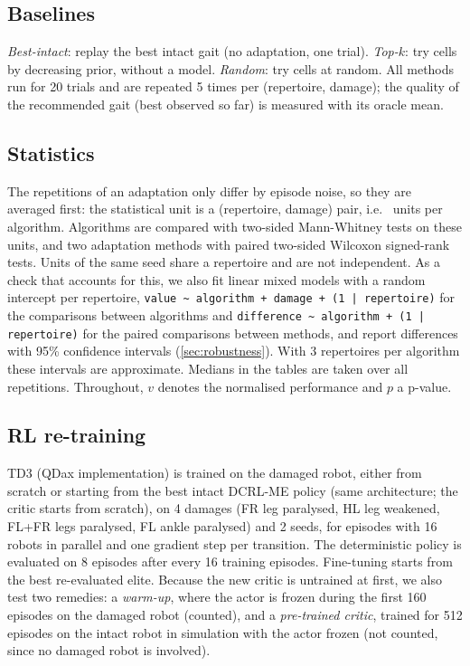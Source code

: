 \documentclass[11pt,a4paper]{article}
\newcommand{\DCRL}{DCRL-ME}
\begin{document}
\subsection{Baselines}
\emph{Best-intact}: replay the best intact gait (no adaptation, one trial). \emph{Top-$k$}: try cells by decreasing
prior, without a model. \emph{Random}: try cells at random. All methods run for 20 trials and are repeated 5 times
per (repertoire, damage); the quality of the recommended gait (best observed so far) is measured with its oracle mean.

\subsection{Statistics}
The repetitions of an adaptation only differ by episode noise, so they are averaged first: the statistical unit is a
(repertoire, damage) pair, i.e.\ \NUnits{} units per algorithm. Algorithms are compared with two-sided Mann-Whitney
tests on these units, and two adaptation methods with paired two-sided Wilcoxon signed-rank tests. Units of the same
seed share a repertoire and are not independent. As a check that accounts for this, we also fit linear mixed models
with a random intercept per repertoire, \texttt{value \textasciitilde{} algorithm + damage + (1 | repertoire)} for the
comparisons between algorithms and \texttt{difference \textasciitilde{} algorithm + (1 | repertoire)} for the paired
comparisons between methods, and report differences with 95\% confidence intervals (\cref{sec:robustness}). With 3
repertoires per algorithm these intervals are approximate. Medians in the tables are taken over all repetitions.
Throughout, $v$ denotes the normalised performance and $p$ a p-value.

\subsection{RL re-training}
TD3 (QDax implementation) is trained on the damaged robot, either from scratch or starting from the best intact
\DCRL{} policy (same architecture; the critic starts from scratch), on 4 damages (FR leg paralysed, HL leg weakened,
FL+FR legs paralysed, FL ankle paralysed) and 2 seeds, for \RLMaxEpisodes{} episodes with 16 robots in parallel and
one gradient step per transition. The deterministic policy is evaluated on 8 episodes after every 16 training
episodes. Fine-tuning starts from the best re-evaluated elite. Because the new critic is untrained at first, we also
test two remedies: a \emph{warm-up}, where the actor is frozen during the first 160 episodes on the damaged robot
(counted), and a \emph{pre-trained critic}, trained for 512 episodes on the intact robot in simulation with the actor
frozen (not counted, since no damaged robot is involved).
\end{document}
